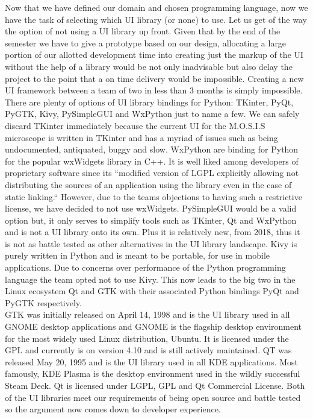 Now that we have defined our domain and chosen programming language, now we have the task of selecting which UI library (or none) to use. Let us get of the way the option of not using a UI library up front. Given that by the end of the semester we have to give a prototype based on our design, allocating a large portion of our allotted development time into creating just the markup of the UI without the help of a library would be not only inadvisable but also delay the project to the point that a on time delivery would be impossible. Creating a new UI framework between a team of two in less than 3 months is simply impossible.\\
There are plenty of options of UI library bindings for Python: TKinter, PyQt, PyGTK, Kivy, PySimpleGUI and WxPython just to name a few. We can safely discard TKinter immediately because the current UI for the M.O.S.I.S microscope is written in TKinter and has a myriad of issues such as being undocumented, antiquated, buggy and slow. WxPython are binding for Python for the popular wxWidgets library in C++. It is well liked among developers of proprietary software since its ``modified version of LGPL explicitly allowing not distributing the sources of an application using the library even in the case of static linking.``\cite{WxWidgetsWxWidgets2023} However, due to the teams objections to having such a restrictive license, we have decided to not use wxWidgets. PySimpleGUI would be a valid option but, it only serves to simplify tools such as TKinter, Qt and WxPython and is not a UI library onto its own. Plus it is relatively new, from 2018, thus it is not as battle tested as other alternatives in the UI library landscape. Kivy is purely written in Python and is meant to be portable, for use in mobile applications. Due to concerns over performance of the Python programming language the team opted not to use Kivy. This now leads to the big two in the Linux ecosystem Qt and GTK with their associated Python bindings PyQt and PyGTK respectively.\\
GTK was initially released on April 14, 1998 and is the UI library used in all GNOME desktop applications and GNOME is the flagship desktop environment for the most widely used Linux distribution, Ubuntu.\cite{GNOME2023}\cite{Ubuntu2023} It is licensed under the GPL and currently is on version 4.10 and is still actively maintained. QT was released May 20, 1995 and is the UI library used in all KDE applications.\cite{QtSoftware2023} Most famously, KDE Plasma is the desktop environment used in the wildly successful Steam Deck.\cite{SteamDeck2023} Qt is licensed under LGPL, GPL and Qt Commercial License.\cite{QtLicensingQt} Both of the UI libraries meet our requirements of being open source and battle tested so the argument now comes down to developer experience.\\
